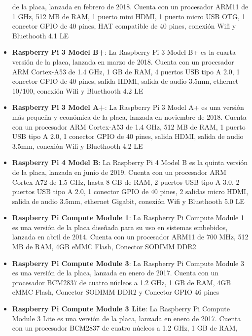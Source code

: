 \begin{itemize}
            de la placa, lanzada en febrero de 2018. Cuenta con un procesador ARM11 de 1 GHz, 512 MB de RAM, 
            1 puerto mini HDMI, 1 puerto micro USB OTG, 1 conector GPIO de 40 pines, HAT compatible de 40 pines, 
            conexi\'on Wifi y Bluethooth 4.1 LE \cite{Santamaria2023}
        \item \textbf{Raspberry Pi 3 Model B+}: La Raspberry Pi 3 Model B+ es la cuarta versi\'on de la placa,
            lanzada en marzo de 2018. Cuenta con un procesador ARM Cortex-A53 de 1.4 GHz, 1 GB de RAM, 
            4 puertos USB tipo A 2.0, 1 conector GPIO de 40 pines, salida HDMI, salida de audio 3.5mm, ethernet 10/100, 
            conexi\'on Wifi y Bluethooth 4.2 LE \cite{Santamaria2023}
        \item \textbf{Raspberry Pi 3 Model A+}: La Raspberry Pi 3 Model A+ es una versi\'on m\'as peque\~na y 
            econ\'omica de la placa, lanzada en noviembre de 2018. Cuenta con un procesador ARM Cortex-A53 de 1.4 GHz, 
            512 MB de RAM, 1 puerto USB tipo A 2.0, 1 conector GPIO de 40 pines, salida HDMI, salida de audio 3.5mm, 
            conexi\'on Wifi y Bluethooth 4.2 LE \cite{Santamaria2023}
        \item \textbf{Raspberry Pi 4 Model B}: La Raspberry Pi 4 Model B es la quinta versi\'on de la placa,
            lanzada en junio de 2019. Cuenta con un procesador ARM Cortex-A72 de 1.5 GHz, hasta 8 GB de RAM, 
            2 puertos USB tipo A 3.0, 2 puertos USB tipo A 2.0, 1 conector GPIO de 40 pines, 2 salidas micro HDMI, 
            salida de audio 3.5mm, ethernet Gigabit, conexi\'on Wifi y Bluethooth 5.0 LE \cite{Santamaria2023}
        \item \textbf{Raspberry Pi Compute Module 1}: La Raspberry Pi Compute Module 1 es una versi\'on de la placa 
            dise\~nada para su uso en sistemas embebidos, lanzada en abril de 2014. Cuenta con un procesador ARM11 de 700 MHz, 
            512 MB de RAM, 4GB eMMC Flash, Conector SODIMM DDR2 \cite{Santamaria2023}
        \item \textbf{Raspberry Pi Compute Module 3}: La Raspberry Pi Compute Module 3 es una versi\'on de la placa, 
            lanzada en enero de 2017. Cuenta con un procesador BCM2837 de cuatro n\'ucleos a 1.2 GHz, 1 GB de RAM, 4GB eMMC Flash,
            Conector SODIMM DDR2 y Conector GPIO 46 pines \cite{Santamaria2023}
        \item \textbf{Raspberry Pi Compute Module 3 Lite}: La Raspberry Pi Compute Module 3 Lite es una versi\'on de la placa,
            lanzada en enero de 2017. Cuenta con un procesador BCM2837 de cuatro n\'ucleos a 1.2 GHz, 1 GB de RAM,

\end{itemize}
